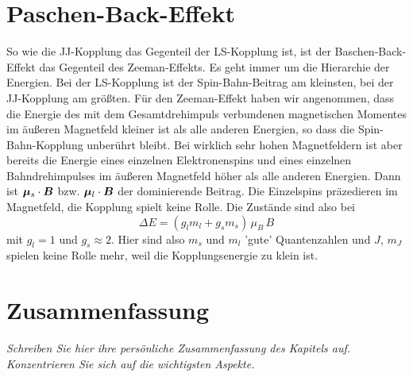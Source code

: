 \section{Paschen-Back-Effekt}

So wie die JJ-Kopplung das Gegenteil der LS-Kopplung ist, ist der Baschen-Back-Effekt das Gegenteil des Zeeman-Effekts. Es geht immer um die Hierarchie der Energien. Bei der LS-Kopplung ist der Spin-Bahn-Beitrag am kleinsten, bei der JJ-Kopplung am größten. Für den Zeeman-Effekt haben wir angenommen, dass die Energie des mit dem Gesamtdrehimpuls verbundenen magnetischen Momentes im äußeren Magnetfeld kleiner ist als alle anderen Energien, so dass die Spin-Bahn-Kopplung unberührt bleibt. Bei wirklich sehr hohen Magnetfeldern ist aber bereits die Energie eines einzelnen Elektronenspins und eines einzelnen Bahndrehimpulses im äußeren Magnetfeld höher als alle anderen Energien. Dann ist $ \boldsymbol{\mu}_s \cdot \boldsymbol{B}$ bzw. $ \boldsymbol{\mu}_l \cdot \boldsymbol{B}$ der dominierende Beitrag. Die Einzelspins präzedieren im Magnetfeld, die Kopplung spielt keine Rolle. Die Zustände sind also bei 
\begin{equation}
    \Delta E = \left( g_l m_l + g_s m_s \right) \, \mu_B \, B 
\end{equation}
mit $g_l = 1$ und $g_s \approx 2$. Hier sind also $m_s$ und $m_l$ 'gute' Quantenzahlen und $J$, $m_J$ spielen keine Rolle mehr, weil die Kopplungsenergie zu klein ist.

%




\newpage

\section{Zusammenfassung}


\textit{Schreiben Sie hier ihre persönliche Zusammenfassung des Kapitels auf. Konzentrieren Sie sich auf die wichtigsten Aspekte.}

\vspace*{10cm}

\printbibliography[segment=\therefsegment,heading=subbibliography]
